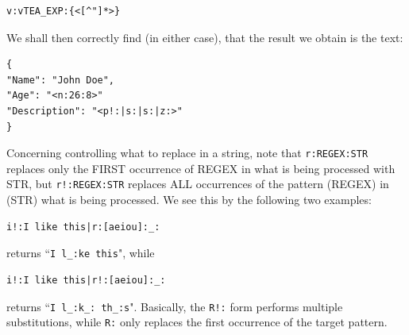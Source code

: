 \documentclass[a4paper, 18pt]{book} %
\begin{document}
{{{\vspace{2em}

\begin{verbatim}
v:vTEA_EXP:{<[^"]*>}
\end{verbatim}

\vspace{2em}

We shall then correctly find (in either case), that the result we obtain is the text:


\begin{verbatim}
{
"Name": "John Doe",
"Age": "<n:26:8>"
"Description": "<p!:|s:|s:|z:>"
}
\end{verbatim}


\vspace{2em}


Concerning controlling what to replace in a string, note that \texttt{r:REGEX:STR} replaces only the FIRST occurrence of REGEX in what is being processed with STR, but \texttt{r!:REGEX:STR} replaces ALL occurrences of the pattern (REGEX) in (STR) what is being processed. We see this by the following two examples:


\vspace{1em}

  \begin{tcolorbox}[teaterminalstyle, title=R: EXAMPLE 2, breakable]
  \begin{lstlisting}[language=TEA,breaklines=true,]
i!:I like this|r:[aeiou]:_: 
   \end{lstlisting}
  \end{tcolorbox}

\vspace{1em}

returns ``\verb|I l_:ke this|", while 

\vspace{1em}

  \begin{tcolorbox}[teaterminalstyle, title=R: EXAMPLE 3, breakable]
  \begin{lstlisting}[language=TEA,breaklines=true,]
i!:I like this|r!:[aeiou]:_:  
   \end{lstlisting}
  \end{tcolorbox}

\vspace{1em}


returns ``\verb|I l_:k_: th_:s|". Basically, the \texttt{R!:} form performs multiple substitutions, while \texttt{R:} only replaces the first occurrence of the target pattern.


}}}
\end{document}
